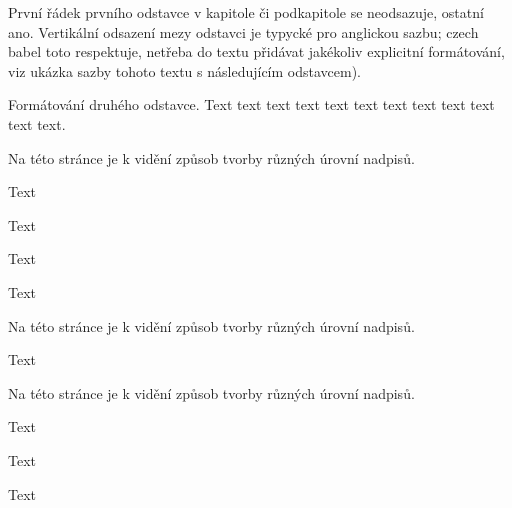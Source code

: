 
První řádek prvního odstavce v kapitole či podkapitole se neodsazuje, ostatní ano. Vertikální odsazení mezy odstavci je typycké pro anglickou sazbu; czech babel toto respektuje, netřeba do textu přidávat jakékoliv explicitní formátování, viz ukázka sazby tohoto textu s následujícím odstavcem).

Formátování druhého odstavce. Text text text text text text text text text text text text.



Na této stránce je k vidění způsob tvorby různých úrovní nadpisů.

Text

Text



Text

Text


Na této stránce je k vidění způsob tvorby různých úrovní nadpisů.

Text










Na této stránce je k vidění způsob tvorby různých úrovní nadpisů.

Text

Text

Text

